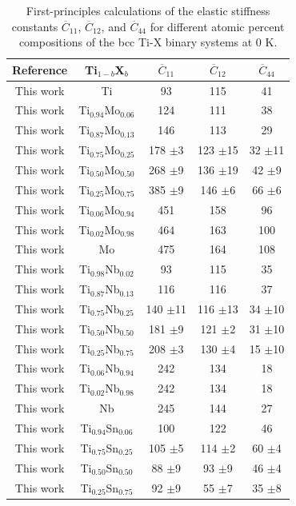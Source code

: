 \newpage
\begin{longtable}[H]{ c c c c c}
	\caption{First-principles calculations of the elastic stiffness constants $\overline{C}_{11}$, $\overline{C}_{12}$, and $\overline{C}_{44}$ for different atomic percent compositions of the bcc Ti-X binary systems at 0 K.}	\label{Ch5-table:tixelassc} \\
	\hline
	Reference & Ti$_{1-b}$X$_b$ & $\overline{C}_{11}$ & $\overline{C}_{12}$ & $\overline{C}_{44}$\\
	\hline
	\endhead
	\hline
	\endfoot
	This work & Ti & 93 & 115 & 41\\
	This work & Ti$_{0.94}$Mo$_{0.06}$ & 124 & 111 & 38\\
	This work & Ti$_{0.87}$Mo$_{0.13}$ & 146 & 113 & 29\\
	This work & Ti$_{0.75}$Mo$_{0.25}$ & 178 $\pm$3 & 123 $\pm$15 & 32 $\pm$11\\
	This work & Ti$_{0.50}$Mo$_{0.50}$ & 268 $\pm$9 & 136 $\pm$19 & 42 $\pm$9\\
	This work & Ti$_{0.25}$Mo$_{0.75}$ & 385 $\pm$9 & 146 $\pm$6 & 66 $\pm$6\\
	This work & Ti$_{0.06}$Mo$_{0.94}$ & 451 & 158 & 96\\
	This work & Ti$_{0.02}$Mo$_{0.98}$ & 464 & 163 & 100\\
	This work & Mo & 475 & 164 & 108\\
	This work & Ti$_{0.98}$Nb$_{0.02}$ & 93 & 115 & 35\\
	This work & Ti$_{0.87}$Nb$_{0.13}$ & 116 & 116 & 37\\
	This work & Ti$_{0.75}$Nb$_{0.25}$ & 140 $\pm$11 & 116 $\pm$13 & 34 $\pm$10\\
	This work & Ti$_{0.50}$Nb$_{0.50}$ & 181 $\pm$9 & 121 $\pm$2 & 31 $\pm$10\\
	This work & Ti$_{0.25}$Nb$_{0.75}$ & 208 $\pm$3 & 130 $\pm$4 & 15 $\pm$10\\
	This work & Ti$_{0.06}$Nb$_{0.94}$ & 242 & 134 & 18\\
	This work & Ti$_{0.02}$Nb$_{0.98}$ & 242 & 134 & 18\\
	This work & Nb & 245 & 144 & 27\\
	This work & Ti$_{0.94}$Sn$_{0.06}$ & 100 & 122 & 46 \\
	This work & Ti$_{0.75}$Sn$_{0.25}$ & 105 $\pm$5 & 114 $\pm$2 & 60 $\pm$4\\
	This work & Ti$_{0.50}$Sn$_{0.50}$ & 88 $\pm$9 & 93 $\pm$9 & 46 $\pm$4\\
	This work & Ti$_{0.25}$Sn$_{0.75}$ & 92 $\pm$9 & 55 $\pm$7 & 35 $\pm$8\\

\end{longtable}
